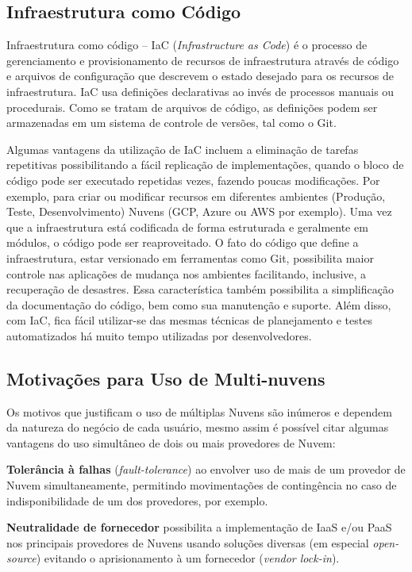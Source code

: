 \documentclass[12pt]{article}
\begin{document}
	\subsection{Infraestrutura como Código}
	
	Infraestrutura como código – IaC (\textit{Infrastructure as Code}) é o processo de gerenciamento e provisionamento de recursos de infraestrutura através de código e arquivos de configuração que descrevem o estado desejado para os recursos de infraestrutura. IaC usa definições declarativas ao invés de processos manuais ou procedurais. Como se tratam de arquivos de código, as definições podem ser armazenadas em um sistema de controle de versões, tal como o Git.
	 
	Algumas vantagens da utilização de IaC incluem a eliminação de tarefas repetitivas possibilitando a fácil replicação de implementações, quando o bloco de código pode ser executado repetidas vezes, fazendo poucas modificações. Por exemplo, para criar ou modificar recursos em diferentes ambientes (Produção, Teste, Desenvolvimento) Nuvens (GCP, Azure ou AWS por exemplo). Uma vez que a infraestrutura  está codificada de forma estruturada e geralmente em módulos, o código pode ser reaproveitado. O fato do código que define a infraestrutura, estar versionado em ferramentas como Git, possibilita maior controle nas aplicações de mudança nos ambientes facilitando, inclusive, a recuperação de desastres. Essa característica também possibilita a simplificação da documentação do código, bem como sua manutenção e suporte. Além disso, com IaC, fica fácil utilizar-se das mesmas técnicas de planejamento e testes automatizados há muito tempo utilizadas por desenvolvedores.	
	
	\subsection{Motivações para Uso de Multi-nuvens}
	
	Os motivos que justificam o uso de múltiplas Nuvens são inúmeros e dependem da natureza do negócio de cada usuário, mesmo assim é possível citar algumas vantagens do uso simultâneo de dois ou mais provedores de Nuvem:
	
	\textbf{Tolerância à falhas} (\textit{fault-tolerance}) ao envolver uso de mais de um provedor de Nuvem simultaneamente, permitindo movimentações de contingência no caso de indisponibilidade de um dos provedores, por exemplo.
	
	\textbf{Neutralidade de fornecedor} possibilita a implementação de IaaS e/ou PaaS nos principais provedores de Nuvens usando soluções diversas (em especial \textit{open-source}) evitando o aprisionamento à um fornecedor (\textit{vendor lock-in}).
	
\end{document}
